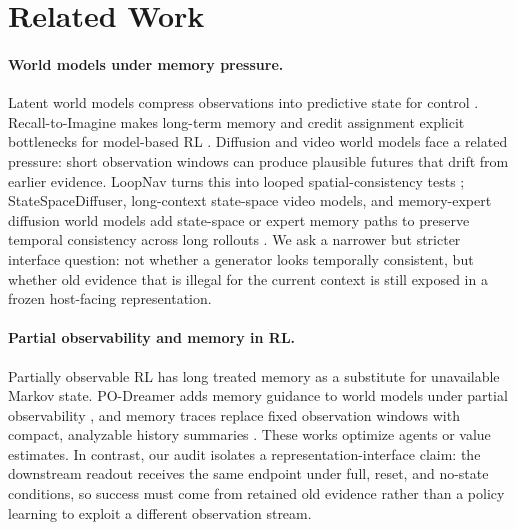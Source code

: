 \section{Related Work}

\paragraph{World models under memory pressure.}
Latent world models compress observations into predictive state for control
\citep{r_dreamer}.  Recall-to-Imagine makes long-term memory and credit
assignment explicit bottlenecks for model-based RL \citep{r_r2i}.  Diffusion and
video world models face a related pressure: short observation windows can
produce plausible futures that drift from earlier evidence.  LoopNav turns this
into looped spatial-consistency tests \citep{r_loopnav}; StateSpaceDiffuser,
long-context state-space video models, and memory-expert diffusion world models
add state-space or expert memory paths to preserve temporal consistency across
long rollouts \citep{r_statespacediffuser,r_lcsvwm,r_memory_experts}.  We ask a
narrower but stricter interface question: not whether a generator looks
temporally consistent, but whether old evidence that is illegal for the current
context is still exposed in a frozen host-facing representation.

\paragraph{Partial observability and memory in RL.}
Partially observable RL has long treated memory as a substitute for unavailable
Markov state.  PO-Dreamer adds memory guidance to world models under partial
observability \citep{r_po_dreamer}, and memory traces replace fixed observation
windows with compact, analyzable history summaries \citep{r_memory_traces}.
These works optimize agents or value estimates.  In contrast, our audit isolates
a representation-interface claim: the downstream readout receives the same
endpoint under full, reset, and no-state conditions, so success must come from
retained old evidence rather than a policy learning to exploit a different
observation stream.

